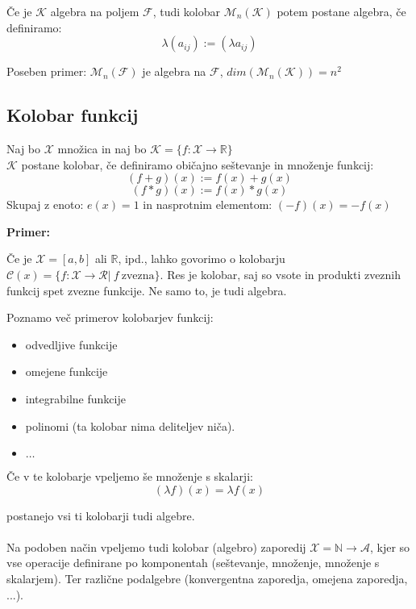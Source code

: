\documentclass[a4paper]{article}
\newcounter{environment:definition_counter}
\newcounter{environment:theorem_counter}
\newcounter{environment:statement_counter}
\newcounter{example:example_counter}
\newenvironment{example}
{\textbf{Primer:}\\}
{\setcounter{example:example_counter}{0}}
\newenvironment{example_case}
{\refstepcounter{example:example_counter} \arabic{example:example_counter}.}
{\\}
\begin{document}
Če je $\mathcal{K}$ algebra na poljem $\mathcal{F}$, tudi kolobar $\mathcal{M}_n(\mathcal{K})$ potem postane algebra, če definiramo:
$$\lambda (a_{ij}) := (\lambda a_{ij})$$

Poseben primer: $\mathcal{M}_n(\mathcal{F})$ je algebra na $\mathcal{F}$, $dim(\mathcal{M}_n(\mathcal{K}))= n^2$


\subsection{Kolobar funkcij}

Naj bo $\mathcal{X}$ množica in naj bo $\mathcal{K} = \{ f : \mathcal{X} \to \mathbb{R}\}$\\

$\mathcal{K}$ postane kolobar, če definiramo običajno seštevanje in množenje funkcij:
$$(f+g)(x) := f(x) + g(x) $$
$$(f*g)(x) := f(x) * g(x) $$
Skupaj z enoto: $e(x) = 1$ in nasprotnim elementom: $(-f)(x) = -f(x)$ 

\begin{example}
\begin{example_case}
Če je $\mathcal{X} = [a,b]$ ali $\mathbb{R}$, ipd., lahko govorimo o kolobarju $\mathcal{C}(x) = \{f: \mathcal{X} \to \mathcal{R} | \ f \ \text{zvezna} \}$. Res je kolobar, saj so vsote in produkti zveznih funkcij spet zvezne funkcije. Ne samo to, je tudi algebra.
\end{example_case}
\end{example}

Poznamo več primerov kolobarjev funkcij:
\begin{itemize}
\item odvedljive funkcije
\item omejene funkcije 
\item integrabilne funkcije 
\item polinomi (ta kolobar nima deliteljev niča).
\item $\dots$
\end{itemize}

Če v te kolobarje vpeljemo še množenje s skalarji:
\begin{equation}
\label{eq:def_scala_multiplication_functions}
(\lambda f) (x) = \lambda f(x)
\end{equation}

postanejo vsi ti kolobarji tudi algebre.
\\
\\
Na podoben način vpeljemo tudi kolobar (algebro) zaporedij $\mathcal{X} = \mathbb{N} \to \mathcal{A}$, kjer so vse operacije definirane po komponentah (seštevanje, množenje, množenje s skalarjem). Ter različne podalgebre (konvergentna zaporedja, omejena zaporedja, ...).
\end{document}
